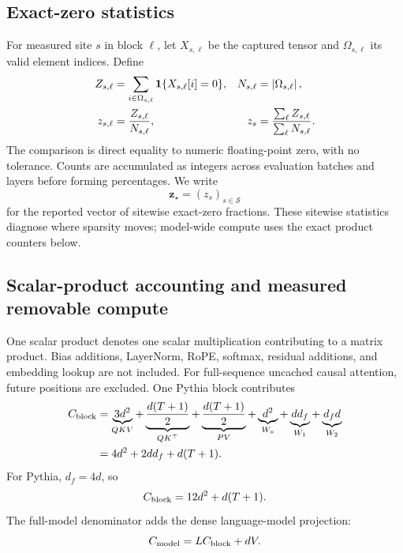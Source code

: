 \subsection{Exact-zero statistics}
\label{sec:zero-statistics}

For measured site $s$ in block $\ell$, let $X_{s,\ell}$ be the captured tensor
and $\Omega_{s,\ell}$ its valid element indices. Define
\begin{align}
    Z_{s,\ell}
      &=\sum_{i\in\Omega_{s,\ell}}\mathbf{1}\{X_{s,\ell}[i]=0\},
    &
    N_{s,\ell}&=\left\lvert \Omega_{s,\ell}\right\rvert,
    \label{eq:site-zero-counts}\\
    z_{s,\ell}
      &=\frac{Z_{s,\ell}}{N_{s,\ell}},
    &
    z_s&=\frac{\sum_\ell Z_{s,\ell}}{\sum_\ell N_{s,\ell}}.
    \label{eq:site-zero-fractions}
\end{align}
The comparison is direct equality to numeric floating-point zero, with no
tolerance. Counts are accumulated as integers across evaluation batches and
layers before forming percentages. We write
\begin{equation}
    \bm z_\star=(z_s)_{s\in\mathcal S}
    \label{eq:z-star}
\end{equation}
for the reported vector of sitewise exact-zero fractions. These sitewise
statistics diagnose where sparsity moves; model-wide compute uses the exact
product counters below.

\subsection{Scalar-product accounting and measured removable compute}
\label{sec:compute-accounting}

One scalar product denotes one scalar multiplication contributing to a matrix
product. Bias additions, LayerNorm, RoPE, softmax, residual additions, and
embedding lookup are not included. For full-sequence uncached causal attention,
future positions are excluded. One Pythia block contributes
\begin{align}
    C_{\mathrm{block}}
      &=\underbrace{3d^2}_{QKV}
        +\underbrace{\frac{d(T+1)}{2}}_{QK^\top}
        +\underbrace{\frac{d(T+1)}{2}}_{PV}
        +\underbrace{d^2}_{W_o}
        +\underbrace{dd_f}_{W_1}
        +\underbrace{d_f d}_{W_2}
    \nonumber\\
      &=4d^2+2dd_f+d(T+1).
    \label{eq:block-denominator-general}
\end{align}
For Pythia, $d_f=4d$, so
\begin{equation}
    C_{\mathrm{block}}=12d^2+d(T+1).
    \label{eq:block-denominator-pythia}
\end{equation}
The full-model denominator adds the dense language-model projection:
\begin{equation}
    C_{\mathrm{model}}=LC_{\mathrm{block}}+dV.
    \label{eq:model-denominator}
\end{equation}

